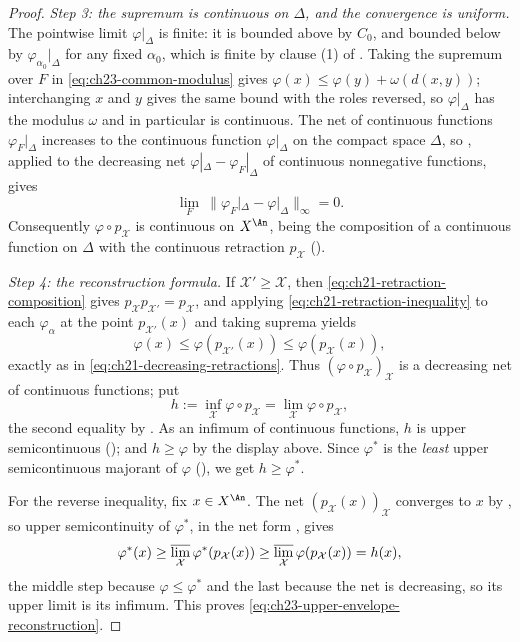 \begin{proof}
\emph{Step 3: the supremum is continuous on $\Delta$, and the convergence
is uniform.}  The pointwise limit $\varphi|_\Delta$ is finite: it is
bounded above by $C_0$, and bounded below by
$\varphi_{\alpha_0}|_\Delta$ for any fixed $\alpha_0$, which is finite
by clause (1) of .  Taking the
supremum over $F$ in \eqref{eq:ch23-common-modulus} gives
$\varphi(x)\leq\varphi(y)+\omega(d(x,y))$; interchanging $x$ and $y$
gives the same bound with the roles reversed, so $\varphi|_\Delta$ has the
modulus $\omega$ and in particular is continuous.  The net of continuous
functions $\varphi_F|_\Delta$ increases to the continuous function
$\varphi|_\Delta$ on the compact space $\Delta$, so
, applied to the decreasing net
$\varphi|_\Delta-\varphi_F|_\Delta$ of continuous nonnegative functions,
gives
\begin{equation}\label{eq:ch23-dini-on-skeleton}
 \lim_F\ \bigl\|\varphi_F|_\Delta-\varphi|_\Delta\bigr\|_\infty=0 .
\end{equation}
Consequently $\varphi\circ p_{\mathcal X}$ is continuous on $X^{\An}$,
being the composition of a continuous function on $\Delta$ with the
continuous retraction $p_{\mathcal X}$
().

\emph{Step 4: the reconstruction formula.}  If
$\mathcal X'\geq\mathcal X$, then
\eqref{eq:ch21-retraction-composition} gives
$p_{\mathcal X}p_{\mathcal X'}=p_{\mathcal X}$, and applying
\eqref{eq:ch21-retraction-inequality} to each $\varphi_\alpha$ at the point
$p_{\mathcal X'}(x)$ and taking suprema yields
\[
 \varphi(x)\leq\varphi(p_{\mathcal X'}(x))\leq\varphi(p_{\mathcal X}(x)),
\]
exactly as in \eqref{eq:ch21-decreasing-retractions}.  Thus
$(\varphi\circ p_{\mathcal X})_{\mathcal X}$ is a decreasing net of
continuous functions; put
\[
                        h:=\inf_{\mathcal X}
                             \varphi\circ p_{\mathcal X}
                        =\lim_{\mathcal X}\varphi\circ p_{\mathcal X},
\]
the second equality by .  As an infimum of
continuous functions, $h$ is upper semicontinuous
(); and $h\geq\varphi$ by the display above.  Since
$\varphi^*$ is the \emph{least} upper semicontinuous majorant of
$\varphi$ (), we get $h\geq\varphi^*$.

For the reverse inequality, fix $x\in X^{\An}$.  The net
$(p_{\mathcal X}(x))_{\mathcal X}$ converges to $x$ by
, so upper semicontinuity of
$\varphi^*$, in the net form , gives
\begin{equation}\label{eq:ch23-usc-reconstruction-bound}
 \varphi^*(x)
 \geq\varlimsup_{\mathcal X}
           \varphi^*(p_{\mathcal X}(x))
 \geq\varlimsup_{\mathcal X}
           \varphi(p_{\mathcal X}(x))
 =h(x),
\end{equation}
the middle step because $\varphi\leq\varphi^*$ and the last because the
net is decreasing, so its upper limit is its infimum.  This proves
\eqref{eq:ch23-upper-envelope-reconstruction}.


\end{proof}
